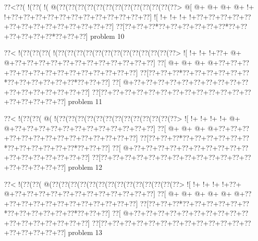 \vbox{\vbox{\goo
\0??<\0??(\- !(\0??(\- !(\- @(\0??(\0??(\0??(\0??(\0??(\0??(\0??(\0??(\0??(\0??(\0??(\0??(\0??>
\- @[\- @+\- @+\- @+\- @+\- !+\- !+\0??+\0??+\0??+\0??+\0??+\0??+\0??+\0??+\0??+\0??+\0??+\0??]
\- ![\- !+\- !+\- !+\- !+\0??+\0??+\0??+\0??+\0??+\0??+\0??+\0??+\0??+\0??+\0??+\0??+\0??+\0??]
\0??[\0??+\0??+\0??*\0??+\0??+\0??+\0??+\0??+\0??*\0??+\0??+\0??+\0??+\0??+\0??*\0??+\0??+\0??]
}
\hfil problem 10\hfil\break
}



\vbox{\vbox{\goo
\0??<\- !(\0??(\0??(\0??(\- !(\0??(\0??(\0??(\0??(\0??(\0??(\0??(\0??(\0??(\0??(\0??(\0??(\0??>
\- ![\- !+\- !+\- !+\0??+\- @+\- @+\0??+\0??+\0??+\0??+\0??+\0??+\0??+\0??+\0??+\0??+\0??+\0??]
\0??[\- @+\- @+\- @+\- @+\0??+\0??+\0??+\0??+\0??+\0??+\0??+\0??+\0??+\0??+\0??+\0??+\0??+\0??]
\0??[\0??+\0??+\0??*\0??+\0??+\0??+\0??+\0??+\0??*\0??+\0??+\0??+\0??+\0??+\0??*\0??+\0??+\0??]
\0??[\- @+\0??+\0??+\0??+\0??+\0??+\0??+\0??+\0??+\0??+\0??+\0??+\0??+\0??+\0??+\0??+\0??+\0??]
\0??[\0??+\0??+\0??+\0??+\0??+\0??+\0??+\0??+\0??+\0??+\0??+\0??+\0??+\0??+\0??+\0??+\0??+\0??]
}
\hfil problem 11\hfil\break
}



\vbox{\vbox{\goo
\0??<\- !(\0??(\0??(\- @(\- !(\0??(\0??(\0??(\0??(\0??(\0??(\0??(\0??(\0??(\0??(\0??(\0??(\0??>
\- ![\- !+\- !+\- !+\- !+\- @+\- @+\0??+\0??+\0??+\0??+\0??+\0??+\0??+\0??+\0??+\0??+\0??+\0??]
\0??[\- @+\- @+\- @+\- @+\0??+\0??+\0??+\0??+\0??+\0??+\0??+\0??+\0??+\0??+\0??+\0??+\0??+\0??]
\0??[\0??+\0??+\0??*\0??+\0??+\0??+\0??+\0??+\0??*\0??+\0??+\0??+\0??+\0??+\0??*\0??+\0??+\0??]
\0??[\- @+\0??+\0??+\0??+\0??+\0??+\0??+\0??+\0??+\0??+\0??+\0??+\0??+\0??+\0??+\0??+\0??+\0??]
\0??[\0??+\0??+\0??+\0??+\0??+\0??+\0??+\0??+\0??+\0??+\0??+\0??+\0??+\0??+\0??+\0??+\0??+\0??]
}
\hfil problem 12\hfil\break
}



\vbox{\vbox{\goo
\0??<\- !(\0??(\0??(\- @(\0??(\0??(\0??(\0??(\0??(\0??(\0??(\0??(\0??(\0??(\0??(\0??(\0??(\0??>
\- ![\- !+\- !+\- !+\- !+\0??+\- @+\0??+\0??+\0??+\0??+\0??+\0??+\0??+\0??+\0??+\0??+\0??+\0??]
\0??[\- @+\- @+\- @+\- @+\- @+\- @+\0??+\0??+\0??+\0??+\0??+\0??+\0??+\0??+\0??+\0??+\0??+\0??]
\0??[\0??+\0??+\0??*\0??+\0??+\0??+\0??+\0??+\0??*\0??+\0??+\0??+\0??+\0??+\0??*\0??+\0??+\0??]
\0??[\- @+\0??+\0??+\0??+\0??+\0??+\0??+\0??+\0??+\0??+\0??+\0??+\0??+\0??+\0??+\0??+\0??+\0??]
\0??[\0??+\0??+\0??+\0??+\0??+\0??+\0??+\0??+\0??+\0??+\0??+\0??+\0??+\0??+\0??+\0??+\0??+\0??]
}
\hfil problem 13\hfil\break
}



